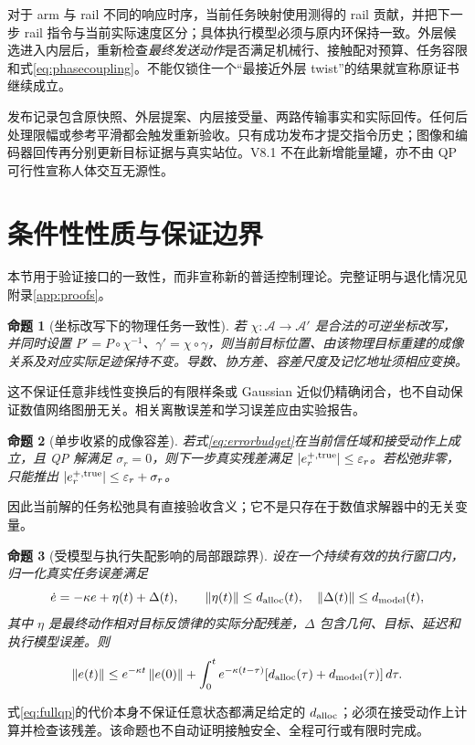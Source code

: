 \documentclass[UTF8,11pt,a4paper,fontset=fandol]{ctexart}
\numberwithin{equation}{section}
\newtheorem{proposition}{命题}[section]
\theoremstyle{definition}
\newcommand{\norm}[1]{\left\lVert#1\right\rVert}
\begin{document}
对于 arm 与 rail 不同的响应时序，当前任务映射使用测得的 rail 贡献，并把下一步 rail 指令与当前实际速度区分；具体执行模型必须与原内环保持一致。外层候选进入内层后，重新检查\emph{最终发送动作}是否满足机械行、接触配对预算、任务容限和式\eqref{eq:phasecoupling}。不能仅锁住一个“最接近外层 twist”的结果就宣称原证书继续成立。

发布记录包含原快照、外层提案、内层接受量、两路传输事实和实际回传。任何后处理限幅或参考平滑都会触发重新验收。只有成功发布才提交指令历史；图像和编码器回传再分别更新目标证据与真实站位。V8.1 不在此新增能量罐，亦不由 QP 可行性宣称人体交互无源性。

\section{条件性性质与保证边界}
\label{sec:theory}
本节用于验证接口的一致性，而非宣称新的普适控制理论。完整证明与退化情况见附录\ref{app:proofs}。

\begin{proposition}[坐标改写下的物理任务一致性]
若 $\chi:\mathcal A\rightarrow\mathcal A'$ 是合法的可逆坐标改写，并同时设置 $P'=P\circ\chi^{-1}$、$\gamma'=\chi\circ\gamma$，则当前目标位置、由该物理目标重建的成像关系及对应实际足迹保持不变。导数、协方差、容差尺度及记忆地址须相应变换。
\end{proposition}
这不保证任意非线性变换后的有限样条或 Gaussian 近似仍精确闭合，也不自动保证数值网络图册无关。相关离散误差和学习误差应由实验报告。

\begin{proposition}[单步收紧的成像容差]
若式\eqref{eq:errorbudget}在当前信任域和接受动作上成立，且 QP 解满足 $\sigma_r=0$，则下一步真实残差满足 $|e_r^{+,\rm true}|\le\varepsilon_r$。若松弛非零，只能推出 $|e_r^{+,\rm true}|\le\varepsilon_r+\sigma_r$。
\end{proposition}
因此当前解的任务松弛具有直接验收含义；它不是只存在于数值求解器中的无关变量。

\begin{proposition}[受模型与执行失配影响的局部跟踪界]
设在一个持续有效的执行窗口内，归一化真实任务误差满足
\begin{equation}
\dot e=-\kappa e+\eta(t)+\Delta(t),\qquad
\norm{\eta(t)}\le d_{\rm alloc}(t),\quad
\norm{\Delta(t)}\le d_{\rm model}(t),
\label{eq:issmodel}
\end{equation}
其中 $\eta$ 是最终动作相对目标反馈律的实际分配残差，$\Delta$ 包含几何、目标、延迟和执行模型误差。则
\begin{equation}
\norm{e(t)}\le e^{-\kappa t}\norm{e(0)}+
\int_0^t e^{-\kappa(t-\tau)}
[d_{\rm alloc}(\tau)+d_{\rm model}(\tau)]\,d\tau.
\label{eq:issbound}
\end{equation}
\end{proposition}
式\eqref{eq:fullqp}的代价本身不保证任意状态都满足给定的 $d_{\rm alloc}$；必须在接受动作上计算并检查该残差。该命题也不自动证明接触安全、全程可行或有限时完成。
\end{document}
